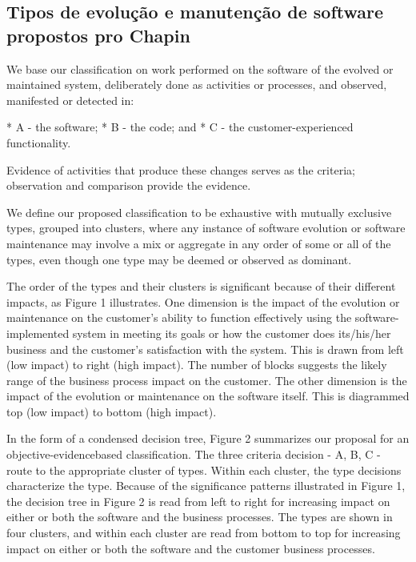 \subsection{Tipos de evolução e manutenção de software propostos pro Chapin}
\label{section:chapinTypes}

We base our classification on work performed on the software of the evolved or maintained system,
deliberately done as activities or processes, and observed, manifested or detected in:

* A - the software;
* B - the code; and
* C - the customer-experienced functionality.

Evidence of activities that produce these changes serves as the criteria; observation and comparison
provide the evidence.

We define our proposed classification to be exhaustive with mutually exclusive types, grouped into clusters, 
where any instance of software evolution or software maintenance may involve a mix or aggregate in any 
order of some or all of the types, even though one type may be deemed or observed as dominant.

The order of the types and their clusters is significant because of their different impacts, as Figure 1
illustrates. One dimension is the impact of the evolution or maintenance on the customer's ability to
function effectively using the software-implemented system in meeting its goals or how the customer 
does its/his/her business and the customer's satisfaction with the system. This is drawn from left 
(low impact) to right (high impact). The number of blocks suggests the likely range of the business 
process impact on the customer. The other dimension is the impact of the evolution or maintenance 
on the software itself. This is diagrammed top (low impact) to bottom (high impact).


In the form of a condensed decision tree, Figure 2 summarizes our proposal for an 
objective-evidencebased classification. The three criteria decision - A, B, C - route to the appropriate 
cluster of types. Within each cluster, the type decisions characterize the type. Because of the 
significance patterns illustrated in Figure 1, the decision tree in Figure 2 is read from 
left to right for increasing impact on either or both the software and the business processes. 
The types are shown in four clusters, and within each cluster are read from bottom to top 
for increasing impact on either or both the software and the customer business processes.

